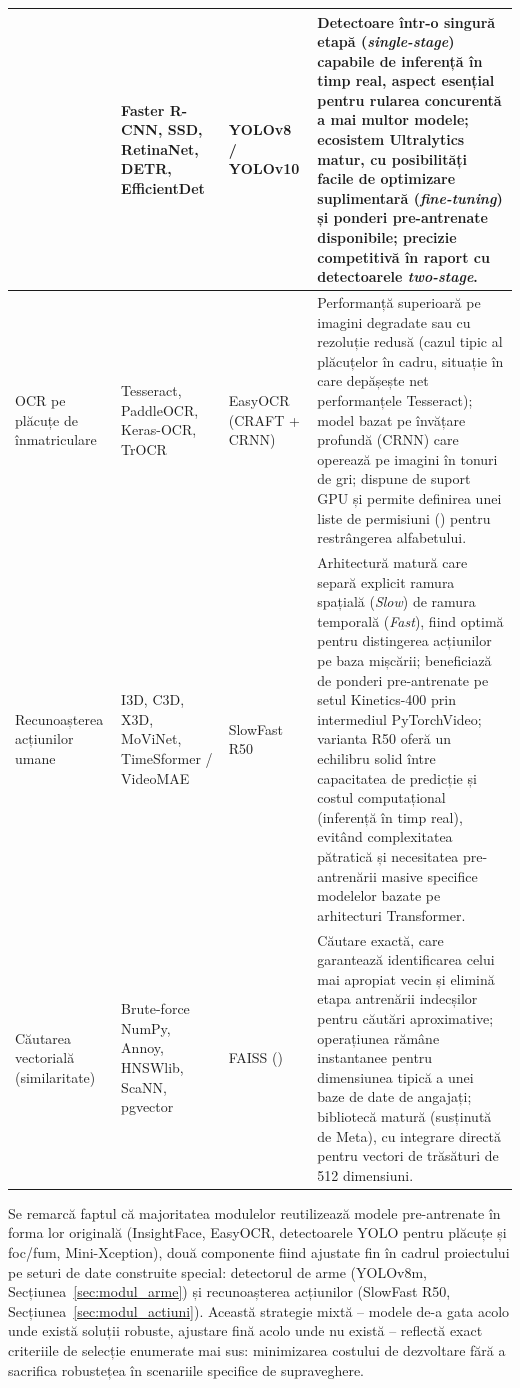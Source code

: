 \documentclass[../../main.tex]{subfiles}
\begin{document}
{\begin{xltabular}{\textwidth}{@{}>{\raggedright\arraybackslash}p{2.3cm} >{\raggedright\arraybackslash}p{2.9cm} >{\raggedright\arraybackslash}p{2.2cm} X@{}}
		& Faster R-CNN, SSD, RetinaNet, DETR, EfficientDet
		& YOLOv8 / YOLOv10
		& Detectoare într-o singură etapă (\textit{single-stage}) capabile de inferență în timp real, aspect esențial pentru rularea concurentă a mai multor modele; ecosistem Ultralytics matur, cu posibilități facile de optimizare suplimentară (\textit{fine-tuning}) și ponderi pre-antrenate disponibile; precizie competitivă în raport cu detectoarele \textit{two-stage}. \\
		\hline
		OCR pe plăcuțe de înmatriculare
		& Tesseract, PaddleOCR, Keras-OCR, TrOCR
		& EasyOCR (CRAFT + CRNN)
		& Performanță superioară pe imagini degradate sau cu rezoluție redusă (cazul tipic al plăcuțelor în cadru, situație în care depășește net performanțele Tesseract); model bazat pe învățare profundă (CRNN) care operează pe imagini în tonuri de gri; dispune de suport GPU și permite definirea unei liste de permisiuni () pentru restrângerea alfabetului. \\
		\hline
		Recunoașterea acțiunilor umane
		& I3D, C3D, X3D, MoViNet, TimeSformer / VideoMAE
		& SlowFast R50
		& Arhitectură matură care separă explicit ramura spațială (\textit{Slow}) de ramura temporală (\textit{Fast}), fiind optimă pentru distingerea acțiunilor pe baza mișcării; beneficiază de ponderi pre-antrenate pe setul Kinetics-400 prin intermediul PyTorchVideo; varianta R50 oferă un echilibru solid între capacitatea de predicție și costul computațional (inferență în timp real), evitând complexitatea pătratică și necesitatea pre-antrenării masive specifice modelelor bazate pe arhitecturi Transformer. \\
		\hline
		Căutarea vectorială (similaritate)
		& Brute-force NumPy, Annoy, HNSWlib, ScaNN, pgvector
		& FAISS ()
		& Căutare exactă, care garantează identificarea celui mai apropiat vecin și elimină etapa antrenării indecșilor pentru căutări aproximative; operațiunea rămâne instantanee pentru dimensiunea tipică a unei baze de date de angajați; bibliotecă matură (susținută de Meta), cu integrare directă pentru vectori de trăsături de 512 dimensiuni. \\
		\hline
	\end{xltabular}
	\par}
	
	
Se remarcă faptul că majoritatea modulelor reutilizează modele pre-antrenate în
forma lor originală (InsightFace, EasyOCR, detectoarele YOLO pentru plăcuțe și
foc/fum, Mini-Xception), două componente fiind ajustate fin în cadrul proiectului
pe seturi de date construite special: detectorul de arme (YOLOv8m,
Secțiunea~\ref{sec:modul_arme}) și recunoașterea acțiunilor (SlowFast R50,
Secțiunea~\ref{sec:modul_actiuni}). Această strategie mixtă -- modele de-a gata
acolo unde există soluții robuste, ajustare fină acolo unde nu există -- reflectă
exact criteriile de selecție enumerate mai sus: minimizarea costului de dezvoltare
fără a sacrifica robustețea în scenariile specifice de supraveghere.
\end{document}
